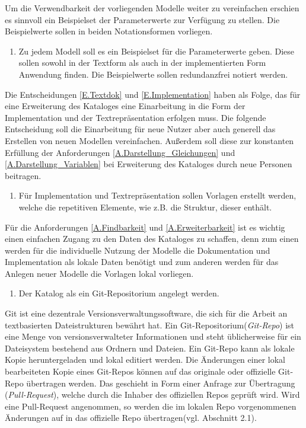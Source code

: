 Um die Verwendbarkeit der vorliegenden Modelle weiter zu vereinfachen erschien es sinnvoll ein Beispielset der Parameterwerte zur Verfügung zu stellen. Die Beispielwerte sollen in beiden Notationsformen vorliegen.
\begin{enumerate}[resume*]
	\item \label{E.Parameterwerte}Zu jedem Modell soll es ein Beispielset für die Parameterwerte geben. Diese sollen sowohl in der Textform als auch in der implementierten Form Anwendung finden. Die Beispielwerte sollen redundanzfrei notiert werden.
\end{enumerate}

Die Entscheidungen \ref{E.Textdok} und \ref{E.Implementation} haben als Folge, das für eine Erweiterung des Kataloges eine Einarbeitung in die Form der Implementation und der Textrepräsentation erfolgen muss. Die folgende Entscheidung soll die Einarbeitung für neue Nutzer aber auch generell das Erstellen von neuen Modellen vereinfachen. Außerdem soll diese zur konstanten Erfüllung der Anforderungen \ref{A.Darstellung_Gleichungen} und \ref{A.Darstellung_Variablen} bei Erweiterung des Kataloges durch neue Personen beitragen.
\begin{enumerate}[resume*]
	\item \label{E.Vorlagen}Für Implementation und Textrepräsentation sollen Vorlagen erstellt werden, welche die repetitiven Elemente, wie z.B. die Struktur, dieser enthält. 
\end{enumerate}

Für die Anforderungen \ref{A.Findbarkeit} und \ref{A.Erweiterbarkeit} ist es wichtig einen einfachen Zugang zu den Daten des Kataloges zu schaffen, denn zum einen werden für die individuelle Nutzung der Modelle die Dokumentation und Implementation als lokale Daten benötigt und zum anderen werden für das Anlegen neuer Modelle die Vorlagen lokal vorliegen. 
\begin{enumerate}[resume*]
	\item \label{E.Git}Der Katalog als ein Git-Repositorium angelegt werden.
\end{enumerate}
Git ist eine dezentrale Versionsverwaltungssoftware, die sich für die Arbeit an textbasierten Dateistrukturen bewährt hat. Ein Git-Repositorium(\textit{Git-Repo}) ist eine Menge von versionsverwalteter Informationen und steht üblicherweise für ein Dateisystem bestehend aus Ordnern und Dateien. Ein Git-Repo kann als lokale Kopie heruntergeladen und lokal editiert werden. Die Änderungen einer lokal bearbeiteten Kopie eines Git-Repos können auf das originale oder offizielle Git-Repo übertragen werden. Das geschieht in Form einer Anfrage zur Übertragung (\textit{Pull-Request}), welche durch die Inhaber des offiziellen Repos geprüft wird. Wird eine Pull-Request angenommen, so werden die im lokalen Repo vorgenommenen Änderungen auf in das offizielle Repo übertragen(vgl. \cite{KNHE20a} Abschnitt 2.1).

